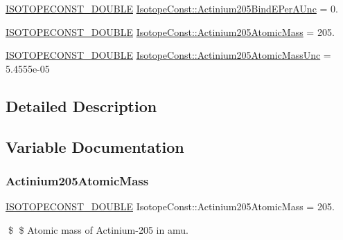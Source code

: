 \begin{DoxyCompactItemize}
\mbox{\hyperlink{group___isotope_const-_macros_ga8f45a7272ce02c0b4c65c44636ed719a}{I\+S\+O\+T\+O\+P\+E\+C\+O\+N\+S\+T\+\_\+\+D\+O\+U\+B\+LE}} \mbox{\hyperlink{group___isotope_const-_actinium-_ac205_gab2e530659efd4a8da948356fc85b9e70}{Isotope\+Const\+::\+Actinium205\+Bind\+E\+Per\+A\+Unc}} = 0.
\item 
\mbox{\hyperlink{group___isotope_const-_macros_ga8f45a7272ce02c0b4c65c44636ed719a}{I\+S\+O\+T\+O\+P\+E\+C\+O\+N\+S\+T\+\_\+\+D\+O\+U\+B\+LE}} \mbox{\hyperlink{group___isotope_const-_actinium-_ac205_ga02a2ab47af53032eb4438a1b05ba4c72}{Isotope\+Const\+::\+Actinium205\+Atomic\+Mass}} = 205.
\item 
\mbox{\hyperlink{group___isotope_const-_macros_ga8f45a7272ce02c0b4c65c44636ed719a}{I\+S\+O\+T\+O\+P\+E\+C\+O\+N\+S\+T\+\_\+\+D\+O\+U\+B\+LE}} \mbox{\hyperlink{group___isotope_const-_actinium-_ac205_gad749bc77ee16f96e1facfb07fb7bebf8}{Isotope\+Const\+::\+Actinium205\+Atomic\+Mass\+Unc}} = 5.\+4555e-\/05
\end{DoxyCompactItemize}


\subsection{Detailed Description}


\subsection{Variable Documentation}
\mbox{\label{group___isotope_const-_actinium-_ac205_ga02a2ab47af53032eb4438a1b05ba4c72}} 
\subsubsection{\texorpdfstring{Actinium205\+Atomic\+Mass}{Actinium205AtomicMass}}
{\footnotesize\ttfamily \mbox{\hyperlink{group___isotope_const-_macros_ga8f45a7272ce02c0b4c65c44636ed719a}{I\+S\+O\+T\+O\+P\+E\+C\+O\+N\+S\+T\+\_\+\+D\+O\+U\+B\+LE}} Isotope\+Const\+::\+Actinium205\+Atomic\+Mass = 205.}

\$ \$ Atomic mass of Actinium-\/205 in amu. \mbox{\label{group___isotope_const-_actinium-_ac205_gad749bc77ee16f96e1facfb07fb7bebf8}} 
